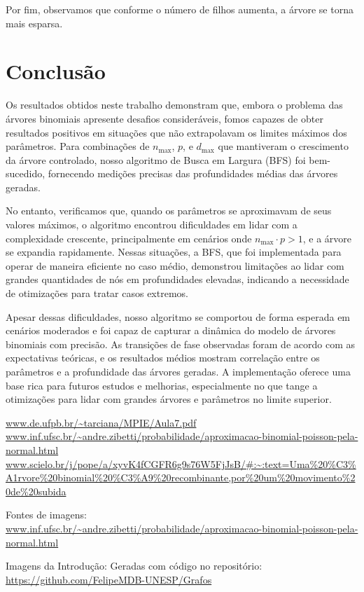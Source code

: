 \documentclass[12pt, a4paper]{scrreprt}
\begin{document}
Por fim, observamos que  conforme o número de filhos aumenta, a árvore se torna mais esparsa.

\chapter{Conclusão}
Os resultados obtidos neste trabalho demonstram que, embora o problema das árvores binomiais apresente desafios consideráveis, fomos capazes de obter resultados positivos em situações que não extrapolavam os limites máximos dos parâmetros. Para combinações de \( n_{\text{max}} \), \( p \), e \( d_{\text{max}} \) que mantiveram o crescimento da árvore controlado, nosso algoritmo de Busca em Largura (BFS) foi bem-sucedido, fornecendo medições precisas das profundidades médias das árvores geradas.

No entanto, verificamos que, quando os parâmetros se aproximavam de seus valores máxi\-mos, o algoritmo encontrou dificuldades em lidar com a complexidade crescente, principalmente em cenários onde \( n_{\text{max}} \cdot p > 1 \), e a árvore se expandia rapidamente. Nessas situações, a BFS, que foi implementada para operar de maneira eficiente no caso médio, demonstrou limitações ao lidar com grandes quantidades de nós em profundidades elevadas, indicando a necessidade de otimizações para tratar casos extremos.

Apesar dessas dificuldades, nosso algoritmo se comportou de forma esperada em cenários moderados e foi capaz de capturar a dinâmica do modelo de árvores binomiais com precisão. As transições de fase observadas foram de acordo com as expectativas teóricas, e os resultados médios mostram correlação entre os parâmetros e a profundidade das árvores geradas. A implementação oferece uma base rica para futuros estudos e melhorias, especialmente no que tange a otimizações para lidar com grandes árvores e parâmetros no limite superior.

\printbibliography %
\url{www.de.ufpb.br/~tarciana/MPIE/Aula7.pdf}\\
\url{www.inf.ufsc.br/~andre.zibetti/probabilidade/aproximacao-binomial-poisson-pela-normal.html}\\
\url{www.scielo.br/j/pope/a/xyvK4fCGFR6g9s76W5FjJsB/#:~:text=Uma%20%C3%A1rvore%20binomial%20%C3%A9%20recombinante,por%20um%20movimento%20de%20subida}

Fontes de imagens:\\
\url{www.inf.ufsc.br/~andre.zibetti/probabilidade/aproximacao-binomial-poisson-pela-normal.html}

Imagens da Introdução: Geradas com código no repositório:\\ \url{https://github.com/FelipeMDB-UNESP/Grafos}
\end{document}
